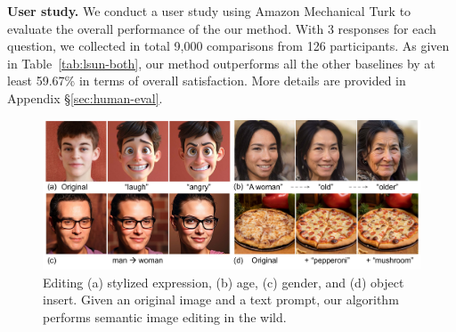 \documentclass{article} %
\theoremstyle{plain}
\begin{document}
\textbf{User study.}
We conduct a user study using Amazon Mechanical Turk to evaluate the overall performance of the our method. 
With 3 responses for each question, we collected in total 9,000 comparisons from 126 participants. 
As given in Table~\ref{tab:lsun-both}, our method outperforms all the other baselines by at least 59.67\% in terms of overall satisfaction.
More details are provided in Appendix \S\ref{sec:human-eval}.


\begin{figure}[!t]
\vspace{-6ex}  
\includegraphics[width=\linewidth]{pics/semantic-edit-all-v2_low.pdf}
\caption{
Editing (a) stylized expression, (b) age, (c) gender, and (d) object insert.
Given an original image and a text prompt, our algorithm performs semantic image editing in the wild.
\vspace{-1ex}
}
\label{fig:sem-edit-all}
\vspace{-3ex}
\end{figure}
\end{document}
